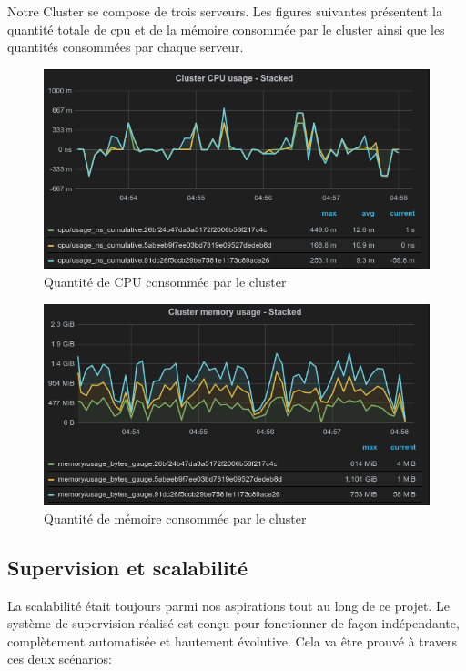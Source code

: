 \begin{onehalfspace}
Notre Cluster se compose de trois serveurs. Les figures suivantes présentent la quantité totale de \acrshort{cpu} et de la mémoire consommée par le cluster ainsi que les quantités consommées par chaque serveur.

\begin{figure}[H]
\centering
\includegraphics [scale=0.6]{chapitre5/assets/cluster-cpu}
\caption{Quantité de CPU consommée par le cluster}
\label{fig:}
\end{figure}

\begin{figure}[H]
\centering
\includegraphics [scale=0.6]{chapitre5/assets/cluster-memory}
\caption{Quantité de mémoire consommée par le cluster}
\label{fig:}
\end{figure}


\subsection{Supervision et scalabilité}

La scalabilité était toujours parmi nos aspirations tout au long de ce projet. Le système de supervision réalisé est conçu pour fonctionner de façon indépendante, complètement automatisée et hautement évolutive. Cela va être prouvé à travers ces deux scénarios:


\end{onehalfspace}
